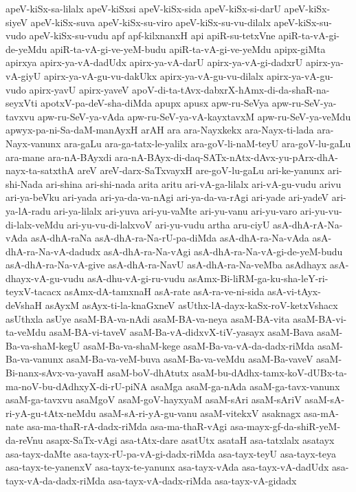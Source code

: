 {apeV-kiSx-sa-lilalx
apeV-kiSxsi
apeV-kiSx-sida
apeV-kiSx-si-darU
apeV-kiSx-siyeV
apeV-kiSx-suva
apeV-kiSx-su-viro
apeV-kiSx-su-vu-dilalx
apeV-kiSx-su-vudo
apeV-kiSx-su-vudu
apf
apf-kilxnanxH
api
apiR-su-tetxVne
apiR-ta-vA-gi-de-yeMdu
apiR-ta-vA-gi-ve-yeM-budu
apiR-ta-vA-gi-ve-yeMdu
apipx-giMta
apirxya
apirx-ya-vA-dadUdx
apirx-ya-vA-darU
apirx-ya-vA-gi-dadxrU
apirx-ya-vA-giyU
apirx-ya-vA-gu-vu-dakUkx
apirx-ya-vA-gu-vu-dilalx
apirx-ya-vA-gu-vudo
apirx-yavU
apirx-yaveV
apoV-di-ta-tAvx-dabxrX-hAmx-di-da-shaR-na-seyxVti
apotxV-pa-deV-sha-diMda
apupx
apusx
apw-ru-SeVya
apw-ru-SeV-ya-tavxvu
apw-ru-SeV-ya-vAda
apw-ru-SeV-ya-vA-kayxtavxM
apw-ru-SeV-ya-veMdu
apwyx-pa-ni-Sa-daM-manAyxH
arAH
ara
ara-Nayxkekx
ara-Nayx-ti-lada
ara-Nayx-vanunx
ara-gaLu
ara-ga-tatx-le-yalilx
ara-goV-li-naM-teyU
ara-goV-lu-gaLu
ara-mane
ara-nA-BAyxdi
ara-nA-BAyx-di-daq-SATx-nAtx-dAvx-yu-pArx-dhA-nayx-ta-satxthA
areV
areV-darx-SaTxvayxH
are-goV-lu-gaLu
ari-ke-yanunx
ari-shi-Nada
ari-shina
ari-shi-nada
arita
aritu
ari-vA-ga-lilalx
ari-vA-gu-vudu
arivu
ari-ya-beVku
ari-yada
ari-ya-da-va-nAgi
ari-ya-da-va-rAgi
ari-yade
ari-yadeV
ari-ya-lA-radu
ari-ya-lilalx
ari-yuva
ari-yu-vaMte
ari-yu-vanu
ari-yu-varo
ari-yu-vu-di-lalx-veMdu
ari-yu-vu-di-lalxvoV
ari-yu-vudu
artha
aru-ciyU
asA-dhA-rA-Na-vAda
asA-dhA-raNa
asA-dhA-ra-Na-rU-pa-diMda
asA-dhA-ra-Na-vAda
asA-dhA-ra-Na-vA-dadudx
asA-dhA-ra-Na-vAgi
asA-dhA-ra-Na-vA-gi-de-yeM-budu
asA-dhA-ra-Na-vA-give
asA-dhA-ra-NavU
asA-dhA-ra-Na-veMba
asAdhayx
asA-dhayx-vA-gu-vudu
asA-dhu-vA-gi-ru-vudu
asAmx-Bi-liRM-ga-ku-sha-leY-ri-teyxV-tacacx
asAmx-dA-tamxnaH
asA-rate
asA-ra-ve-ni-sida
asA-vi-tAyx-deVshaH
asAyxM
asAyx-ti-la-knaGxneV
asUthx-lA-dayx-kaSx-roV-ketxVshacx
asUthxla
asUye
asaM-BA-va-nAdi
asaM-BA-va-neya
asaM-BA-vita
asaM-BA-vi-ta-veMdu
asaM-BA-vi-taveV
asaM-Ba-vA-didxvX-tiV-yasayx
asaM-Bava
asaM-Ba-va-shaM-kegU
asaM-Ba-va-shaM-kege
asaM-Ba-va-vA-da-dadx-riMda
asaM-Ba-va-vanunx
asaM-Ba-va-veM-buva
asaM-Ba-va-veMdu
asaM-Ba-vaveV
asaM-Bi-nanx-sAvx-va-yavaH
asaM-boV-dhAtutx
asaM-bu-dAdhx-tamx-koV-dUBx-ta-ma-noV-bu-dAdhxyX-di-rU-piNA
asaMga
asaM-ga-nAda
asaM-ga-tavx-vanunx
asaM-ga-tavxvu
asaMgoV
asaM-goV-hayxyaM
asaM-sAri
asaM-sAriV
asaM-sA-ri-yA-gu-tAtx-neMdu
asaM-sA-ri-yA-gu-vanu
asaM-vitekxV
asaknagx
asa-mA-nate
asa-ma-thaR-rA-dadx-riMda
asa-ma-thaR-vAgi
asa-mayx-gf-da-shiR-yeM-da-reVnu
asapx-SaTx-vAgi
asa-tAtx-dare
asatUtx
asataH
asa-tatxlalx
asatayx
asa-tayx-daMte
asa-tayx-rU-pa-vA-gi-dadx-riMda
asa-tayx-teyU
asa-tayx-teya
asa-tayx-te-yanenxV
asa-tayx-te-yanunx
asa-tayx-vAda
asa-tayx-vA-dadUdx
asa-tayx-vA-da-dadx-riMda
asa-tayx-vA-dadx-riMda
asa-tayx-vA-gidadx
}
